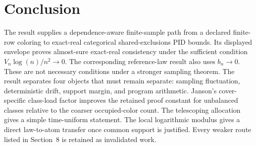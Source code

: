 \documentclass[11pt]{article}
\theoremstyle{definition}
\begin{document}
\section{Conclusion}

The result supplies a dependence-aware finite-sample path from a declared finite-row coloring to
exact-real categorical shared-exclusions PID bounds.  Its displayed envelope proves almost-sure
exact-real consistency under the sufficient condition $V_n\log(n)/n^2\to0$.  The corresponding
reference-law result also uses $b_n\to0$.  These are not necessary conditions under a stronger
sampling theorem.  The result separates
four objects that must remain separate: sampling fluctuation, deterministic drift, support margin,
and program arithmetic.  Janson's cover-specific class-load factor improves the retained proof
constant for unbalanced classes relative to the coarser occupied-color count.
The telescoping allocation gives a simple time-uniform statement.  The local logarithmic modulus
gives a direct law-to-atom transfer once common support is justified.  Every weaker route listed
in Section~8 is retained as invalidated work.
\end{document}
